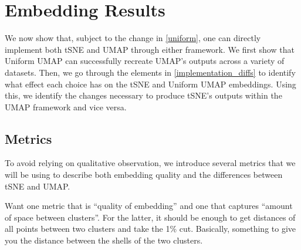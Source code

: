 \documentclass{article}
\theoremstyle{definition}
\begin{document}
\section{Embedding Results} \label{results}
We now show that, subject to the change in \ref{uniform}, one can directly implement both tSNE and UMAP through either framework. We first show that Uniform UMAP
can successfully recreate UMAP's outputs across a variety of datasets. Then, we go through the elements in \ref{implementation_diffs} to identify what effect
each choice has on the tSNE and Uniform UMAP embeddings. Using this, we identify the changes necessary to produce tSNE's outputs within the UMAP framework and vice versa.

\subsection{Metrics}
To avoid relying on qualitative observation, we introduce several metrics that we will be using to describe both embedding quality and the differences between tSNE and UMAP.

Want one metric that is ``quality of embedding'' and one that captures ``amount of space between clusters''. For the latter, it should be enough to get
distances of all points between two clusters and take the 1\% cut. Basically, something to give you the distance between the shells of the two clusters.
\end{document}
